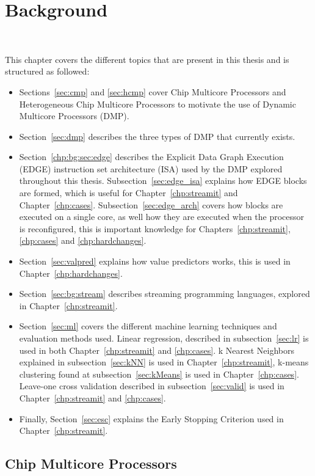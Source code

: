 \chapter{Background}~\label{chp:Background}

This chapter covers the different topics that are present in this thesis and is structured as followed:
\begin{itemize}
\item Sections~\ref{sec:cmp} and \ref{sec:hcmp} cover Chip Multicore Processors and Heterogeneous Chip Multicore Processors to motivate the use of Dynamic Multicore Processors (DMP).
\item Section~\ref{sec:dmp}  describes the three types of DMP that currently exists.
\item Section~\ref{chp:bg:sec:edge} describes the Explicit Data Graph Execution (EDGE) instruction set architecture (ISA) used by the DMP explored throughout this thesis.
Subsection~\ref{sec:edge_isa} explains how EDGE blocks are formed, which is useful for Chapter~\ref{chp:streamit} and Chapter~\ref{chp:cases}.
Subsection~\ref{sec:edge_arch} covers how blocks are executed on a single core, as well how they are executed when the processor is reconfigured, this is important knowledge for Chapters~\ref{chp:streamit}, \ref{chp:cases} and \ref{chp:hardchanges}.
\item Section~\ref{sec:valpred} explains how value predictors works, this is used in Chapter~\ref{chp:hardchanges}.
\item Section~\ref{sec:bg:stream} describes streaming programming languages, explored in Chapter~\ref{chp:streamit}.
\item Section~\ref{sec:ml} covers the different machine learning techniques and evaluation methods used.
Linear regression, described in subsection~\ref{sec:lr} is used in both Chapter~\ref{chp:streamit} and \ref{chp:cases}.
k Nearest Neighbors explained in subsection~\ref{sec:kNN} is used in Chapter~\ref{chp:streamit}, k-means clustering found at subsection~\ref{sec:kMeans} is used in Chapter~\ref{chp:cases}.
Leave-one cross validation described in subsection~\ref{sec:valid} is used in Chapter~\ref{chp:streamit} and \ref{chp:cases}.
\item Finally, Section~\ref{sec:esc} explains the Early Stopping Criterion used in Chapter~\ref{chp:streamit}.
\end{itemize}

\section{Chip Multicore Processors}~\label{sec:cmp}

